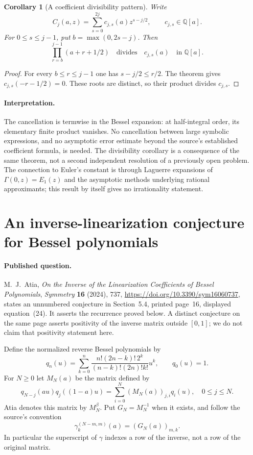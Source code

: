 \documentclass[11pt,a4paper]{article}
\newtheorem{corollary}[theorem]{Corollary}
\theoremstyle{definition}
\theoremstyle{remark}
\numberwithin{equation}{section}
\begin{document}
\begin{corollary}[A coefficient divisibility pattern]
\label{p8:cor:bbc-divisibility}
Write
\[
 C_j(a,z)=\sum_{s=0}^{2j}c_{j,s}(a)z^{s-j/2},
 \qquad c_{j,s}\in\mathbb Q[a].
\]
For $0\leq s\leq j-1$, put $b=\max(0,2s-j)$.  Then
\[
 \prod_{r=b}^{j-1}(a+r+1/2)\quad\text{divides}\quad c_{j,s}(a)
 \quad\text{in }\mathbb Q[a].
\]
\end{corollary}
\begin{proof}
For every $b\leq r\leq j-1$ one has $s-j/2\leq r/2$.
The theorem gives $c_{j,s}(-r-1/2)=0$.
These roots are distinct, so their product divides $c_{j,s}$.
\end{proof}

\paragraph{Interpretation.}
The cancellation is termwise in the Bessel expansion: at half-integral
order, its elementary finite product vanishes.  No cancellation between
large symbolic expressions, and no asymptotic error estimate beyond the
source's established coefficient formula, is needed.
The divisibility corollary is a consequence of the same theorem, not a
second independent resolution of a previously open problem.
The connection to Euler's constant is through Laguerre expansions of
$\Gamma(0,z)=E_1(z)$ and the asymptotic methods underlying rational
approximants; this result by itself gives no irrationality statement.

\section{An inverse-linearization conjecture for Bessel polynomials}
\label{p8:sec:atia-recurrence}

\paragraph{Published question.}
M.~J.~Atia, \emph{On the Inverse of the Linearization Coefficients of
Bessel Polynomials}, \emph{Symmetry} \textbf{16} (2024), 737,
\url{https://doi.org/10.3390/sym16060737}, states an unnumbered
conjecture in Section~5.4, printed page~16, displayed equation~(24).
It asserts the recurrence proved below.  A distinct conjecture on the
same page asserts positivity of the inverse matrix outside $[0,1]$;
we do not claim that positivity statement here.

Define the normalized reverse Bessel polynomials by
\[
 q_n(u)=\sum_{k=0}^n
 \frac{n!(2n-k)!\,2^k}{(n-k)!(2n)!k!}u^k,
 \qquad q_0(u)=1.
\]
For $N\geq0$ let $M_N(a)$ be the matrix defined by
\begin{equation}\label{p8:eq:atia-M-definition}
 q_{N-j}(au)q_j((1-a)u)
 =\sum_{i=0}^N (M_N(a))_{j,i}q_i(u),\quad 0\leq j\leq N.
\end{equation}
Atia denotes this matrix by $M_N^\beta$.
Put $G_N=M_N^{-1}$ when it exists, and follow the source's convention
\[
 \gamma_k^{(N-m,m)}(a)=(G_N(a))_{m,k}.
\]
In particular the superscript of $\gamma$ indexes a row of the inverse,
not a row of the original matrix.
\end{document}
